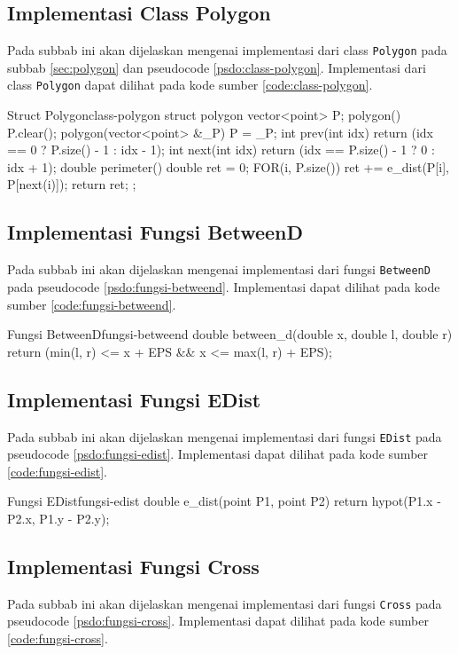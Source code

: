 \subsection{Implementasi Class Polygon}
Pada subbab ini akan dijelaskan mengenai implementasi dari class \texttt{Polygon} pada subbab \ref{sec:polygon} dan pseudocode \ref{psdo:class-polygon}. Implementasi dari class \texttt{Polygon} dapat dilihat pada kode sumber \ref{code:class-polygon}.
\newpage
\begin{code}[firstnumber=1]{Struct Polygon}{class-polygon}
struct polygon{
	vector<point> P;
	polygon(){
		P.clear();
	}
	polygon(vector<point> &_P){
		P = _P;
	}
	int prev(int idx){
		return (idx == 0 ? P.size() - 1 : idx - 1);
	}
	int next(int idx){
		return (idx == P.size() - 1 ? 0 : idx + 1);
	}
	double perimeter(){
		double ret = 0;
		FOR(i, P.size()){
			ret += e_dist(P[i], P[next(i)]);
		}
		return ret;
	}
};
\end{code}

\subsection{Implementasi Fungsi BetweenD}
Pada subbab ini akan dijelaskan mengenai implementasi dari fungsi \texttt{BetweenD} pada pseudocode \ref{psdo:fungsi-betweend}. Implementasi dapat dilihat pada kode sumber \ref{code:fungsi-betweend}.

\begin{code}[firstnumber=1]{Fungsi BetweenD}{fungsi-betweend}
double between_d(double x, double l, double r){
	return (min(l, r) <= x + EPS && x <= max(l, r) + EPS);
}
\end{code}

\subsection{Implementasi Fungsi EDist}
Pada subbab ini akan dijelaskan mengenai implementasi dari fungsi \texttt{EDist} pada pseudocode \ref{psdo:fungsi-edist}. Implementasi dapat dilihat pada kode sumber \ref{code:fungsi-edist}.

\begin{code}[firstnumber=1]{Fungsi EDist}{fungsi-edist}
double e_dist(point P1, point P2){
	return hypot(P1.x - P2.x, P1.y - P2.y);
}
\end{code}

\subsection{Implementasi Fungsi Cross}
Pada subbab ini akan dijelaskan mengenai implementasi dari fungsi \texttt{Cross} pada pseudocode \ref{psdo:fungsi-cross}. Implementasi dapat dilihat pada kode sumber \ref{code:fungsi-cross}.

